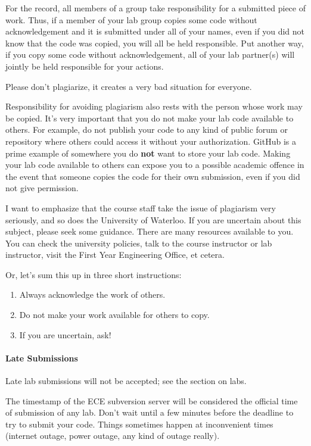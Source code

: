 \documentclass[letterpaper,10pt]{article}
\begin{document}
For the record, all members of a group take responsibility for a submitted piece of work. Thus, if a member of your lab group copies some code without acknowledgement and it is submitted under all of your names, even if you did not know that the code was copied, you will all be held responsible. Put another way, if you copy some code without acknowledgement, all of your lab partner(s) will jointly be held responsible for your actions. 

Please don't plagiarize, it creates a very bad situation for everyone.

Responsibility for avoiding plagiarism also rests with the person whose work may be copied. It's very important that you do not make your lab code available to others. For example, do not publish your code to any kind of public forum or repository where others could access it without your authorization. GitHub is a prime example of somewhere you do \textbf{not} want to store your lab code. Making your lab code available to others can expose you to a possible academic offence in the event that someone copies the code for their own submission, even if you did not give permission.

I want to emphasize that the course staff take the issue of plagiarism very seriously, and so does the University of Waterloo. If you are uncertain about this subject, please seek some guidance. There are many resources available to you. You can check the university policies, talk to the course instructor or lab instructor, visit the First Year Engineering Office, et cetera.

Or, let's sum this up in three short instructions:
\begin{enumerate}
	\item Always acknowledge the work of others. 
	\item Do not make your work available for others to copy.
	\item If you are uncertain, ask!
\end{enumerate}

\paragraph{Late Submissions} Late lab submissions will not be accepted; see the section on labs.

The timestamp of the ECE subversion server will be considered the official time of submission of any lab. Don't wait until a few minutes before the deadline to try to submit your code. Things sometimes happen at inconvenient times (internet outage, power outage, any kind of outage really).
\end{document}
